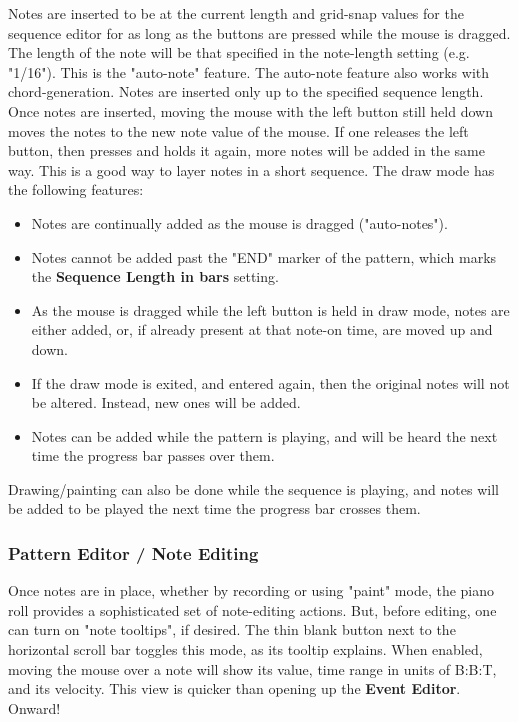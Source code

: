    Notes are inserted to be at the current length and grid-snap values for
   the sequence editor for as long as the buttons are pressed while the mouse
   is dragged.
   The length of the note will
   be that specified in the note-length setting (e.g. "1/16").
   This is the "auto-note" feature.
   The auto-note feature also works with chord-generation.
   Notes are inserted only up to the specified sequence length.
   Once notes are inserted, moving the mouse with the left button still
   held down moves the notes to the new note value of the mouse.
   If one releases the left button, then presses and holds it again,
   more notes will be added in the same way.
   This is a good way to layer notes in a short sequence.
   The draw mode has the following features:

   \begin{itemize}
      \item Notes are continually added as the mouse is dragged ("auto-notes").
      \item Notes cannot be added past the "END" marker of the pattern, which
         marks the \textbf{Sequence Length in bars} setting.
      \item As the mouse is dragged while the left button is held in draw mode,
         notes are either added, or, if already present at that note-on time,
         are moved up and down.
      \item If the draw mode is exited, and entered again, then the original
         notes will not be altered.  Instead, new ones will be added.
      \item Notes can be added while the pattern is playing, and will be heard
         the next time the progress bar passes over them.
   \end{itemize}

   Drawing/painting can also be done while the sequence is playing,
   and notes will be added to be played the next time the progress bar crosses
   them.

\subsubsection{Pattern Editor / Note Editing}
\label{subsubsec:pattern_editor_note_editing}

   Once notes are in place, whether by recording or using "paint" mode,
   the piano roll provides a sophisticated set of note-editing
   actions.
   But, before editing, one can turn on
   "note tooltips", if desired.
   The thin blank button
   next to the horizontal scroll bar toggles this mode, as its tooltip
   explains.
   When enabled, moving the mouse over a note will show its value, time range
   in units of B:B:T, and its velocity.
   This view is quicker than opening up the \textbf{Event Editor}.
   Onward!


